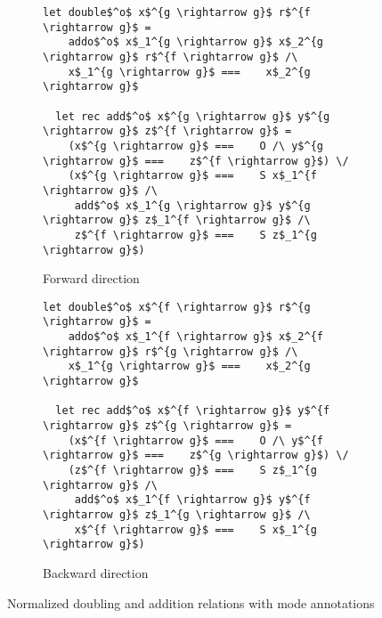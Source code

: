 \begin{figure}[h]
  \centering
  \begin{subfigure}[b]{0.45\textwidth}
    \begin{lstlisting}[frame=tb]
  let double$^o$ x$^{g \rightarrow g}$ r$^{f \rightarrow g}$ =
    addo$^o$ x$_1^{g \rightarrow g}$ x$_2^{g \rightarrow g}$ r$^{f \rightarrow g}$ /\
    x$_1^{g \rightarrow g}$ ===    x$_2^{g \rightarrow g}$

  let rec add$^o$ x$^{g \rightarrow g}$ y$^{g \rightarrow g}$ z$^{f \rightarrow g}$ =
    (x$^{g \rightarrow g}$ ===    O /\ y$^{g \rightarrow g}$ ===    z$^{f \rightarrow g}$) \/
    (x$^{g \rightarrow g}$ ===    S x$_1^{f \rightarrow g}$ /\
     add$^o$ x$_1^{g \rightarrow g}$ y$^{g \rightarrow g}$ z$_1^{f \rightarrow g}$ /\
     z$^{f \rightarrow g}$ ===    S z$_1^{g \rightarrow g}$)
    \end{lstlisting}
    \caption{Forward direction}
    \label{fig:double_fwd}
  \end{subfigure}
  \vspace{0.5cm}

  \begin{subfigure}[b]{0.45\textwidth}
    \begin{lstlisting}[frame=tb]
  let double$^o$ x$^{f \rightarrow g}$ r$^{g \rightarrow g}$ =
    addo$^o$ x$_1^{f \rightarrow g}$ x$_2^{f \rightarrow g}$ r$^{g \rightarrow g}$ /\
    x$_1^{g \rightarrow g}$ ===    x$_2^{g \rightarrow g}$

  let rec add$^o$ x$^{f \rightarrow g}$ y$^{f \rightarrow g}$ z$^{g \rightarrow g}$ =
    (x$^{f \rightarrow g}$ ===    O /\ y$^{f \rightarrow g}$ ===    z$^{g \rightarrow g}$) \/
    (z$^{f \rightarrow g}$ ===    S z$_1^{g \rightarrow g}$ /\
     add$^o$ x$_1^{f \rightarrow g}$ y$^{f \rightarrow g}$ z$_1^{g \rightarrow g}$ /\
     x$^{f \rightarrow g}$ ===    S x$_1^{g \rightarrow g}$)
    \end{lstlisting}
    \caption{Backward direction}
    \label{fig:double_bw}
  \end{subfigure}
  \caption{Normalized doubling and addition relations with mode annotations}
  \label{fig:double_modded}
\end{figure}
